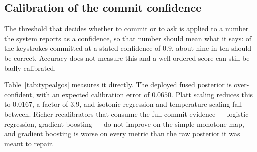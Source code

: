 \documentclass[conference]{IEEEtran}
\begin{document}
\subsection{Calibration of the commit confidence}
\label{sec:confcal}

The threshold that decides whether to commit or to ask is applied to a number
the system reports as a confidence, so that number should mean what it says: of
the keystrokes committed at a stated confidence of $0.9$, about nine in ten
should be correct. Accuracy does not measure this and a well-ordered score can
still be badly calibrated.

Table~\ref{tab:typealgos} measures it directly. The deployed fused posterior is
over-confident, with an expected calibration error of $0.0650$. Platt
scaling reduces this to $0.0167$, a factor of $3.9$, and isotonic regression and
temperature scaling fall between. Richer recalibrators that consume the full
commit evidence --- logistic regression, gradient boosting --- do not improve on
the simple monotone map, and gradient boosting is worse on every metric than the
raw posterior it was meant to repair.
\end{document}
